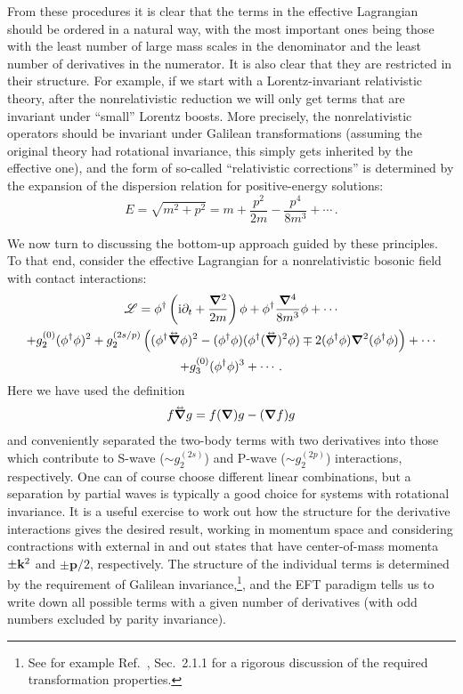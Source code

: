 From these procedures it is clear that the terms in the effective Lagrangian 
should be ordered in a natural way, with the most important ones being those 
with the least number of large mass scales in the denominator and the least 
number of derivatives in the numerator.  It is also clear that they are 
restricted in their structure.  For example, if we start with a 
Lorentz-invariant relativistic theory, after the nonrelativistic reduction we 
will only get terms that are invariant under ``small'' Lorentz boosts.  More 
precisely, the nonrelativistic operators should be invariant under Galilean 
transformations (assuming the original theory had rotational invariance, this 
simply gets inherited by the effective one), and the form of so-called 
``relativistic corrections'' is determined by the expansion of the 
dispersion relation for positive-energy solutions:
%
\begin{equation}
 E = \sqrt{m^2 + p^2}
 = m + \frac{p^2}{2m} - \frac{p^4}{8m^3} + \cdots \,.
\end{equation}

We now turn to discussing the bottom-up approach guided by these principles.  
To that end, consider the effective Lagrangian for a nonrelativistic bosonic 
field with contact interactions:
%
\begin{multline}
 \LL = \phi^\dagger \left(\ii\partial_t + \frac{\Laplace}{2m}\right)\phi
 + \phi^\dagger \frac{\vNabla^4}{8m^3} \phi + \cdots \\
 + g_{2}^{(0)} (\phi^\dagger \phi)^2
 + g_{2}^{(2s/p)} \left(
  (\phi^\dagger\vNablaLR\phi)^2
   - (\phi^\dagger\phi)(\phi^\dagger(\vNablaLR)^2\phi)
   \mp 2 (\phi^\dagger\phi)\vNabla^2(\phi^\dagger\phi)
  \right) + \cdots \\
 + g_{3}^{(0)} (\phi^\dagger \phi)^3 + \cdots \,.
\label{eq:L-phi-generic}
\end{multline}
%
Here we have used the definition
%
\begin{equation}
 f \vNablaLR g = f(\vNabla)g - (\vNabla f)g
\end{equation}
%
and conveniently separated the two-body terms with two derivatives into 
those which contribute to S-wave ($\sim g_{2}^{(2s)}$) and P-wave ($\sim 
g_{2}^{(2p)}$) interactions, respectively.  One can of course choose different 
linear combinations, but a separation by partial waves is typically a good 
choice for systems with rotational invariance.  It is a useful exercise to work 
out how the structure for the derivative interactions gives the desired result, 
working in momentum space and considering contractions with external in and out 
states that have center-of-mass momenta $\pm\mathbf{k}^2$ and $\pm{\mathbf{p}}/2$, respectively.
The structure of the individual terms is determined by the requirement of 
Galilean invariance,\footnote{See for example Ref.~\cite{Hagen:2014}, 
Sec.~2.1.1 for a rigorous discussion of the required transformation 
properties.}, and the EFT paradigm tells us to write down all possible terms 
with a given number of derivatives (with odd numbers excluded by parity 
invariance).

